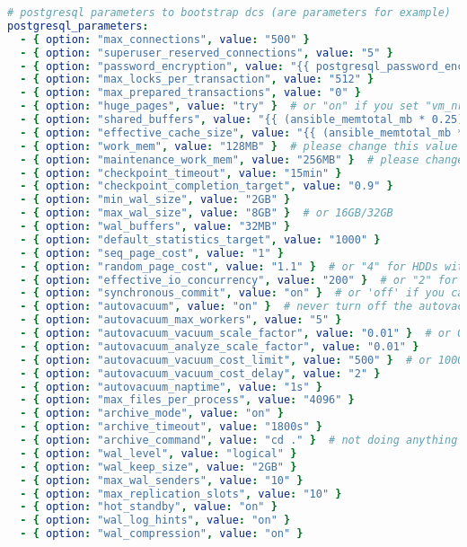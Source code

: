 \begin{flushleft}
\begin{lstlisting}[language=yaml, caption=Testsystem - Deployment - main.yml,captionpos=b,label={lst:testsystem-deployment-main.yml},breaklines=true]
# postgresql parameters to bootstrap dcs (are parameters for example)
postgresql_parameters:
  - { option: "max_connections", value: "500" }
  - { option: "superuser_reserved_connections", value: "5" }
  - { option: "password_encryption", value: "{{ postgresql_password_encryption_algorithm }}" }
  - { option: "max_locks_per_transaction", value: "512" }
  - { option: "max_prepared_transactions", value: "0" }
  - { option: "huge_pages", value: "try" }  # or "on" if you set "vm_nr_hugepages" in kernel parameters
  - { option: "shared_buffers", value: "{{ (ansible_memtotal_mb * 0.25) | int }}MB" }  # by default, 25% of RAM
  - { option: "effective_cache_size", value: "{{ (ansible_memtotal_mb * 0.75) | int }}MB" }  # by default, 75% of RAM
  - { option: "work_mem", value: "128MB" }  # please change this value
  - { option: "maintenance_work_mem", value: "256MB" }  # please change this value
  - { option: "checkpoint_timeout", value: "15min" }
  - { option: "checkpoint_completion_target", value: "0.9" }
  - { option: "min_wal_size", value: "2GB" }
  - { option: "max_wal_size", value: "8GB" }  # or 16GB/32GB
  - { option: "wal_buffers", value: "32MB" }
  - { option: "default_statistics_target", value: "1000" }
  - { option: "seq_page_cost", value: "1" }
  - { option: "random_page_cost", value: "1.1" }  # or "4" for HDDs with slower random access
  - { option: "effective_io_concurrency", value: "200" }  # or "2" for traditional HDDs with lower I/O parallelism
  - { option: "synchronous_commit", value: "on" }  # or 'off' if you can you lose single transactions in case of a crash
  - { option: "autovacuum", value: "on" }  # never turn off the autovacuum!
  - { option: "autovacuum_max_workers", value: "5" }
  - { option: "autovacuum_vacuum_scale_factor", value: "0.01" }  # or 0.005/0.001
  - { option: "autovacuum_analyze_scale_factor", value: "0.01" }
  - { option: "autovacuum_vacuum_cost_limit", value: "500" }  # or 1000/5000
  - { option: "autovacuum_vacuum_cost_delay", value: "2" }
  - { option: "autovacuum_naptime", value: "1s" }
  - { option: "max_files_per_process", value: "4096" }
  - { option: "archive_mode", value: "on" }
  - { option: "archive_timeout", value: "1800s" }
  - { option: "archive_command", value: "cd ." }  # not doing anything yet with WAL-s
  - { option: "wal_level", value: "logical" }
  - { option: "wal_keep_size", value: "2GB" }
  - { option: "max_wal_senders", value: "10" }
  - { option: "max_replication_slots", value: "10" }
  - { option: "hot_standby", value: "on" }
  - { option: "wal_log_hints", value: "on" }
  - { option: "wal_compression", value: "on" }

\end{lstlisting}
\end{flushleft}
